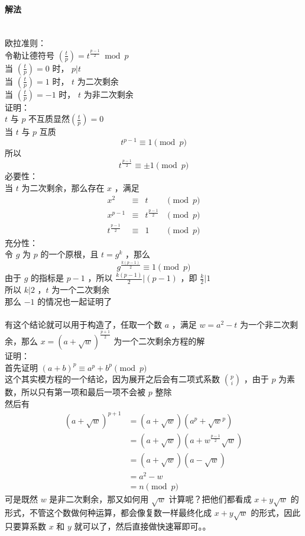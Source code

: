 	\paragraph{解法}~\\
	欧拉准则：\\
	令勒让德符号 $\left(\frac{t}{p} \right)=t^{\frac{p-1}{2}}\bmod p$\\
	当 $\left(\frac{t}{p}\right)=0$ 时， $p|t$\\
	当 $\left(\frac{t}{p}\right)=1$ 时， $t$ 为二次剩余\\
	当 $\left(\frac{t}{p}\right)=-1$ 时， $t$ 为非二次剩余\\
	证明：\\
	$t$ 与 $p$ 不互质显然$\left(\frac{t}{p}\right)=0$\\
	当 $t$ 与 $p$ 互质\\
	$$
	t^{p-1}\equiv1\pmod{p}
	$$
	所以\\
	$$
	t^{\frac{p-1}{2}}\equiv\pm1\pmod p
	$$
	必要性：\\
	当 $t$ 为二次剩余，那么存在 $x$ ，满足\\
	$$
	\begin{aligned}
	x^2&\equiv&t&\pmod p\\
	x^{p-1}&\equiv&t^{\frac{p-1}{2}}&\pmod p\\
	t^{\frac{p-1}{2}}&\equiv&1&\pmod p
	\end{aligned}
	$$
	充分性：\\
	令 $g$ 为 $p$ 的一个原根，且 $t=g^k$ ，那么\\
	$$
	g^{\frac{k(p-1)}{2}}\equiv 1 \pmod p
	$$
	由于 $g$ 的指标是 $p-1$ ，所以 $\frac{k(p-1)}{2}|(p-1)$ ，即 $\frac{k}{2}|1$ \\
	所以 $k|2$ ，$t$ 为一个二次剩余\\
	那么 $-1$ 的情况也一起证明了\\
	~\\
	有这个结论就可以用于构造了，任取一个数 $a$ ，满足 $w=a^2-t$ 为一个非二次剩余，那么 $x=(a+\sqrt w)^{\frac{p+1}{2}}$ 为一个二次剩余方程的解\\
	证明：\\
	首先证明 $(a+b)^p\equiv a^p+b^p\pmod p$\\
	这个其实模方程的一个结论，因为展开之后会有二项式系数 $\binom{p}{i}$ ，由于 $p$ 为素数，所以只有第一项和最后一项不会被 $p$ 整除\\
	然后有
	$$
	\begin{aligned}
	(a+\sqrt w)^{p+1}&=(a+\sqrt w)(a^p+{\sqrt w}^p)
	\\&=(a+\sqrt w)(a+w^{\frac{p-1}{2}}\sqrt w)
	\\&=(a+\sqrt w)(a-\sqrt w)
	\\&=a^2-w
	\\&=n\pmod p
	\end{aligned}
	$$
	可是既然 $w$ 是非二次剩余，那又如何用 $\sqrt w$ 计算呢？把他们都看成 $x+y\sqrt w$ 的形式，不管这个数做何种运算，都会像复数一样最终化成 $x+y\sqrt w$ 的形式，因此只要算系数 $x$ 和 $y$ 就可以了，然后直接做快速幂即可。。\\
	~\\
	~\\
